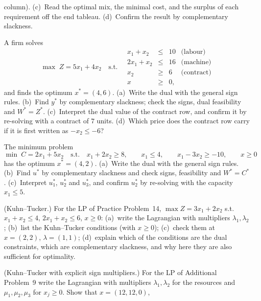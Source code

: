 \begin{problems}
        column). (c)~Read the optimal mix, the minimal cost, and the
        surplus of each requirement off the end tableau. (d)~Confirm the
        result by complementary slackness.
  \item A firm solves
        \[
          \max\; Z=5x_{1}+4x_{2}
          \quad\text{s.t.}\quad
          \begin{array}{rcll}
            x_{1}+x_{2} &\le& 10 & \text{(labour)}\\
            2x_{1}+x_{2} &\le& 16 & \text{(machine)}\\
            x_{2} &\ge& 6 & \text{(contract)}\\
            x &\ge& 0,
          \end{array}
        \]
        and finds the optimum $x^{*}=(4,6)$. (a)~Write the dual with the
        general sign rules. (b)~Find $y^{*}$ by complementary slackness;
        check the signs, dual feasibility and $W^{*}=Z^{*}$.
        (c)~Interpret the dual value of the contract row, and confirm it by
        re-solving with a contract of $7$ units. (d)~Which price does the
        contract row carry if it is first written as $-x_{2}\le -6$?
  \item The minimum problem
        \[
          \min\; C=2x_{1}+5x_{2}
          \quad\text{s.t.}\quad
          x_{1}+2x_{2}\ge 8,\qquad x_{1}\le 4,\qquad
          x_{1}-3x_{2}\ge -10,\qquad x\ge 0
        \]
        has the optimum $x^{*}=(4,2)$. (a)~Write the dual with the
        general sign rules. (b)~Find $u^{*}$ by complementary slackness
        and check signs, feasibility and $W^{*}=C^{*}$. (c)~Interpret
        $u_{1}^{*}$, $u_{2}^{*}$ and $u_{3}^{*}$, and confirm $u_{2}^{*}$
        by re-solving with the capacity $x_{1}\le 5$.
  \item (Kuhn--Tucker.) For the LP of Practice Problem~14,
        $\max Z=3x_{1}+2x_{2}$ s.t.\ $x_{1}+x_{2}\le 4$,
        $2x_{1}+x_{2}\le 6$, $x\ge 0$:
        (a)~write the Lagrangian with multipliers $\lambda_{1},\lambda_{2}$;
        (b)~list the Kuhn--Tucker conditions (with $x\ge 0$);
        (c)~check them at $x=(2,2)$, $\lambda=(1,1)$;
        (d)~explain which of the conditions are the dual constraints,
        which are complementary slackness, and why here they are also
        sufficient for optimality.
  \item (Kuhn--Tucker with explicit sign multipliers.) For the LP of
        Additional Problem~9 write the Lagrangian with multipliers
        $\lambda_{1},\lambda_{2}$ for the resources and $\mu_{1},\mu_{2},
        \mu_{3}$ for $x_{j}\ge 0$. Show that $x=(12,12,0)$,

\end{problems}
